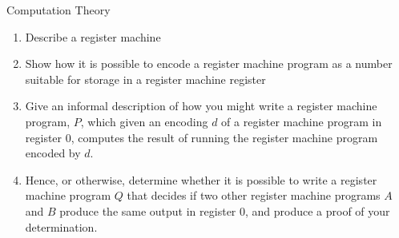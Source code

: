 \documentclass{tripos}  %
\begin{document}
\begin{question}[MockIB,year=2024,paper=2,question=9,author=rrw]{Computation Theory}


\begin{enumerate}
\item Describe a register machine 
\item Show how it is possible to encode a register machine program as a number suitable for storage in a register machine register 
\item Give an informal description of how you might write a register machine program, $P$, which given an encoding $d$ of a register machine program in register 0, computes the result of running the register machine program encoded by $d$. 
\item Hence, or otherwise, determine whether it is possible to write a register machine program $Q$ that decides if two other register machine programs $A$ and $B$ produce the same output in register 0, and produce a proof of your determination. 
\end{enumerate}

\end{question}
\end{document}
